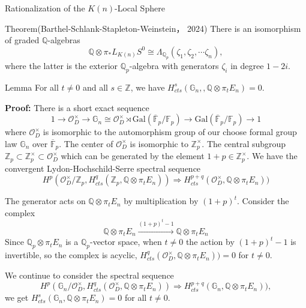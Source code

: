 \documentclass[aspectratio=1610]{ctexbeamer}
\def  \Gal      {\mathrm{Gal}}
\def  \co       {\mathcal{O}}
\def  \bF       {\mathbb{F}}
\def  \bg       {\mathbb{G}}
\def  \bq       {\mathbb{Q}}
\def  \bz       {\mathbb{Z}}
\begin{document}
\begin{frame}{Rationalization of the $K(n)$-Local Sphere}
	
	\begin{alertblock}{Theorem(Barthel-Schlank-Stapleton-Weinstein， 2024)}
		There is an isomorphism of graded $\bq$-algebras
		$$
		\bq \otimes \pi_* L_{K(n)}S^0  \cong  \Lambda_{\bq_p}(\zeta_1, \zeta_2, \dotsm \zeta_n),
		$$
	where the latter is the exterior $\bq_p$-algebra  with generators $\zeta_i$ in degree $1-2i$.
	\end{alertblock}
\end{frame}



\begin{frame}
	\begin{alertblock}{Lemma}
		For all $t \neq 0$ and all $s \in \bz$, we have $H^s_{cts}(\bg_n,, \bq \otimes \pi_t E_n)=0$.
	\end{alertblock}

\textbf{Proof:} There is a short exact sequence
$$
1 \to \co_D^{\times} \to \bg_n \cong \co_D^{\times}  \rtimes \Gal(\overline{\bF}_p/\bF_p) \to   \Gal(\overline{\bF}_p/\bF_p) \to 1
$$
where $\co_D^{\times}$ is isomorphic to the automorphism group of our choose formal group law $\bg_n$ over $\overline{\bF}_p$. The center of $\co_D^{\times}$ is isomorphic to $\bz_p^{\times}$. The central subgroup $\bz_p  \subset \bz_p^{\times}   \subset \co_D^{\times}$ which can be generated by the element $1+p \in \bz_p^{\times}$. We have the convergent Lydon-Hochschild-Serre spectral sequence
$$
H^p(\co_D^{\times}/\bz_p, H^q_{cts}(\bz_p, \bq \otimes \pi_t E_n)) \Longrightarrow  H^{p+q}_{cts}(\co_D^{\times}, \bq \otimes \pi_t E_n))
$$

The generator acts on $\bq \otimes \pi_t E_n$ by multiplication by $(1+p)^t$. Consider the complex
$$
\bq \otimes \pi_t E_n \overset{(1+p)^t-1}{\longrightarrow}  \bq \otimes \pi_t E_n
$$
Since $\bq_p \otimes \pi_t E_n$ is a $\bq_p$-vector space, when $t \neq 0$ the action by $(1+p)^t-1$ is invertible, so the complex is acyclic, $H^q_{cts}(\co_D^{\times}, \bq \otimes \pi_t E_n)) =0$ for $t \neq 0$.
\end{frame}


\begin{frame}
	 We continue to consider the spectral sequence 
	$$
	H^p(\bg_n/ \co_D^{\times}, H^q_{cts}(\co_D^{\times}, \bq \otimes \pi_t E_n)) \Longrightarrow  H^{p+q}_{cts}(\bg_n, \bq \otimes \pi_t E_n)),
	$$
	we get $H^s_{cts}(\bg_n, \bq \otimes \pi_t E_n) =0$ for all $t \neq 0$.
\end{frame}
\end{document}
